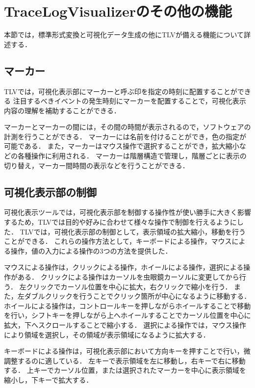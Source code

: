 \section{TraceLogVisualizerのその他の機能}

本節では，標準形式変換と可視化データ生成の他にTLVが備える機能について詳述する．

\subsection{マーカー}
TLVでは，可視化表示部にマーカーと呼ぶ印を指定の時刻に配置することができる
注目するべきイベントの発生時刻にマーカーを配置することで，可視化表示内容の理解を補助することができる．

マーカーとマーカーの間には，その間の時間が表示されるので，ソフトウェアの計測を行うことができる．
マーカーには名前を付けることができ，色の指定が可能である．
また，マーカーはマウス操作で選択することができ，拡大縮小などの各種操作に利用される．
マーカーは階層構造で管理し，階層ごとに表示の切り替え，マーカー間時間の表示などを行うことができる．

\subsection{可視化表示部の制御}

可視化表示ツールでは，可視化表示部を制御する操作性が使い勝手に大きく影響するため，TLVでは目的や好みに合わせて様々な操作で制御を行えるようにした．
TLVでは，可視化表示部の制御として，表示領域の拡大縮小，移動を行うことができる．
これらの操作方法として，キーボードによる操作，マウスによる操作，値の入力による操作の3つの方法を提供した．

マウスによる操作は，クリックによる操作，ホイールによる操作，選択による操作がある．
クリックによる操作はカーソルを虫眼鏡カーソルに変更してから行う．
左クリックでカーソル位置を中心に拡大，右クリックで縮小を行う．
また，左ダブルクリックを行うことでクリック箇所が中心になるように移動する．
ホイールによる操作は，コントロールキーを押しながらホイールすることで移動を行い，シフトキーを押しながら上へホイールすることでカーソル位置を中心に拡大，下へスクロールすることで縮小する．
選択による操作では，マウス操作により領域を選択し，その領域が表示領域になるように拡大する．

キーボードによる操作は，可視化表示部において方向キーを押すことで行い，微調整するのに適している．
左キーで表示領域を左に移動し，右キーで右に移動する．
上キーでカーソル位置，または選択されたマーカーを中心に表示領域を縮小し，下キーで拡大する．

